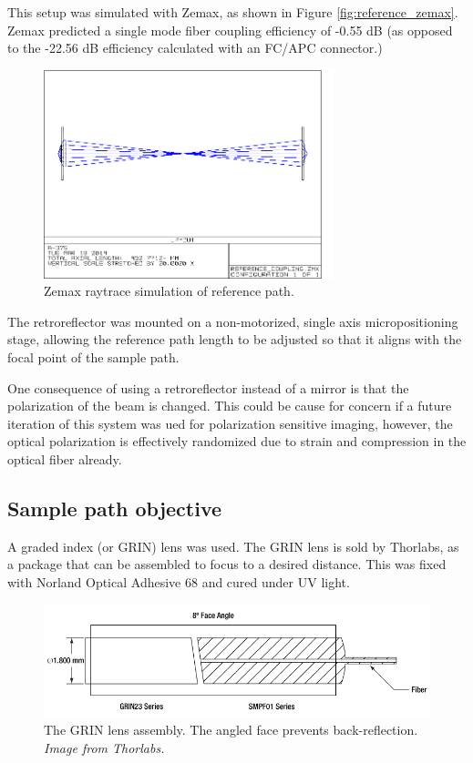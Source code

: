This setup was simulated with Zemax, as shown in Figure \ref{fig:reference_zemax}. Zemax predicted a single mode fiber coupling efficiency of -0.55 dB (as opposed to the -22.56 dB efficiency calculated with an FC/APC connector.)

\begin{figure}[h!]
\centering
\includegraphics[width=0.75\textwidth]{Images/Zemax/RP-raytrace.png}
\caption{Zemax raytrace simulation of reference path.}
\end{figure}

The retroreflector was mounted on a non-motorized, single axis micropositioning stage, allowing the reference path length to be adjusted so that it aligns with the focal point of the sample path.

One consequence of using a retroreflector instead of a mirror is that the polarization of the beam is changed. This could be cause for concern if a future iteration of this system was ued for polarization sensitive imaging, however, the optical polarization is effectively randomized due to strain and compression in the optical fiber already.

\subsection{Sample path objective}

A graded index (or GRIN) lens was used. The GRIN lens is sold by Thorlabs, as a package that can be assembled to focus to a desired distance. This was fixed with Norland Optical Adhesive 68 and cured under UV light.

\begin{figure}[h!]
\centering
\includegraphics[width=1.0\textwidth]{Images/System/grin.png}
\caption{The GRIN lens assembly. The angled face prevents back-reflection. \em{Image from Thorlabs.}}
\end{figure}


